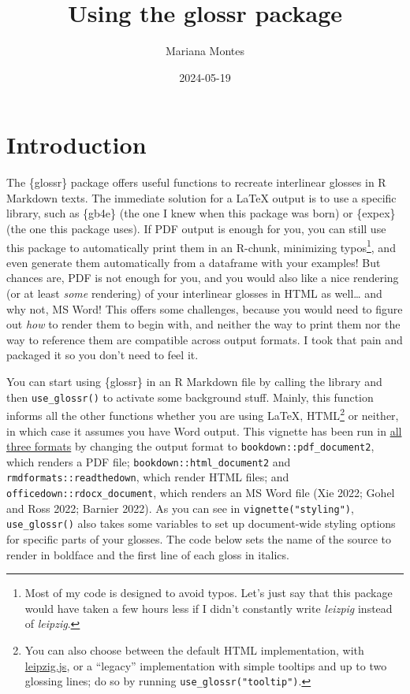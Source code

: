 \documentclass[
  letterpaper,
  DIV=11,
  numbers=noendperiod]{scrartcl}
\title{Using the glossr package}
\author{Mariana Montes}
\date{2024-05-19}
\begin{document}
\maketitle

\section{Introduction}\label{introduction}

The \{glossr\} package offers useful functions to recreate interlinear
glosses in R Markdown texts. The immediate solution for a LaTeX output
is to use a specific library, such as \{gb4e\} (the one I knew when this
package was born) or \{expex\} (the one this package uses). If PDF
output is enough for you, you can still use this package to
automatically print them in an R-chunk, minimizing typos\footnote{Most
  of my code is designed to avoid typos. Let's just say that this
  package would have taken a few hours less if I didn't constantly write
  \emph{leizpig} instead of \emph{leipzig}.}, and even generate them
automatically from a dataframe with your examples! But chances are, PDF
is not enough for you, and you would also like a nice rendering (or at
least \emph{some} rendering) of your interlinear glosses in HTML as
well\ldots{} and why not, MS Word! This offers some challenges, because
you would need to figure out \emph{how} to render them to begin with,
and neither the way to print them nor the way to reference them are
compatible across output formats. I took that pain and packaged it so
you don't need to feel it.

You can start using \{glossr\} in an R Markdown file by calling the
library and then \texttt{use\_glossr()} to activate some background
stuff. Mainly, this function informs all the other functions whether you
are using LaTeX, HTML\footnote{You can also choose between the default
  HTML implementation, with
  \href{https://github.com/bdchauvette/leipzig.js/}{leipzig.js}, or a
  ``legacy'' implementation with simple tooltips and up to two glossing
  lines; do so by running \texttt{use\_glossr("tooltip")}.} or neither,
in which case it assumes you have Word output. This vignette has been
run in
\href{https://github.com/montesmariana/glossr/tree/main/inst/examples}{all
three formats} by changing the output format to
\texttt{bookdown::pdf\_document2}, which renders a PDF file;
\texttt{bookdown::html\_document2} and \texttt{rmdformats::readthedown},
which render HTML files; and \texttt{officedown::rdocx\_document}, which
renders an MS Word file (Xie 2022; Gohel and Ross 2022; Barnier 2022).
As you can see in \texttt{vignette("styling")}, \texttt{use\_glossr()}
also takes some variables to set up document-wide styling options for
specific parts of your glosses. The code below sets the name of the
source to render in boldface and the first line of each gloss in
italics.
\end{document}
